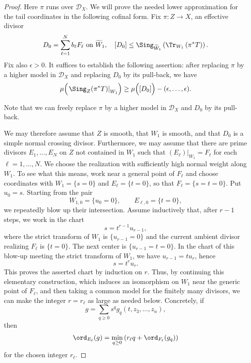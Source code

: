 \begin{proof}
Here $\pi$ runs over $\mathcal{D}_X$. We will prove the needed lower
approximation for the tail coordinates in the following cofinal form. Fix
$\pi\colon Z\rightarrow X$, an effective divisor
\[
    D_0=\sum_{\ell=1}^N b_\ell F_\ell\textup{ on }\widetilde{W}_1,\quad [D_0]\leq \Sing_{\widetilde{W}_1}
    \left(\Tr_{W_1}\left(\pi^*T\right)\right).
\]
Fix also $\epsilon>0$. It suffices to establish the following assertion: after replacing $\pi$ by a higher model in $\mathcal{D}_X$ and replacing $D_0$ by its pull-back, we have
\begin{equation}\label{eq:valuationTcofinalcomparison}
    \mu\Bigl(\left.\Sing_Z(\pi^*T)\right|_{W_1}\Bigr)
    \geq \mu\Bigl( [D_0]\Bigr)-(\epsilon,\dots,\epsilon).
\end{equation}

Note that we can freely replace $\pi$ by a higher model in $\mathcal{D}_X$ and $D_0$ by its pull-back.

We may therefore assume that $Z$ is smooth, that $W_1$ is smooth, and that $D_0$ is a simple normal crossing divisor. Furthermore, we may assume that there are prime divisors $E_1,\ldots,E_N$ on $Z$ not contained in $W_1$ such that $(E_\ell)|_{W_1}=F_\ell$ for each $\ell=1,\ldots,N$. We choose the realization with sufficiently high normal weight along $W_1$. To see what this means, work near a general point of $F_\ell$ and choose coordinates with $W_1=\{s=0\}$ and $E_\ell=\{t=0\}$, so that $F_\ell=\{s=t=0\}$. Put $u_0=s$. Starting from the pair
\[
    W_{1,0}=\{u_0=0\},\qquad E_{\ell,0}=\{t=0\},
\]
we repeatedly blow up their intersection. Assume inductively that, after $r-1$ steps, we work in the chart
\[
    s=t^{r-1}u_{r-1},
\]
where the strict transform of $W_1$ is $\{u_{r-1}=0\}$ and the current ambient divisor realizing $F_\ell$ is $\{t=0\}$. The next center is $\{u_{r-1}=t=0\}$. In the chart of this blow-up meeting the strict transform of $W_1$, we have $u_{r-1}=tu_r$, hence
\[
    s=t^r u_r.
\]
This proves the asserted chart by induction on $r$. Thus, by continuing this elementary construction, which induces an isomorphism on $W_1$ near the generic point of $F_\ell$, and then taking a common model for the finitely many divisors, we can make the integer $r=r_\ell$ as large as needed below. Concretely, if
\[
    g=\sum_{q\geq 0}s^q g_q(t,z_3,\ldots,z_n),
\]
then
\begin{equation}\label{eq:ordEell}
    \ord_{E_\ell}(g)=\min_{q\geq 0}\left(r_\ell q+\ord_{F_\ell}(g_q)\right)
\end{equation}
for the chosen integer $r_\ell$.


\end{proof}
